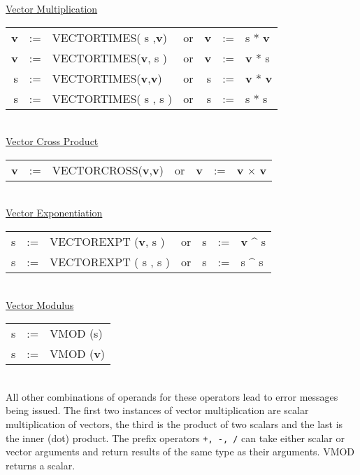 \underline{Vector Multiplication}\\
\begin{tabular}{rclcrcl}
{\bf v} &:=& VECTORTIMES(   s   ,{\bf v})  &{\rm or }& {\bf v} &:=&
s    *  {\bf v} \\
{\bf v} &:=& VECTORTIMES({\bf v},   s   )  &{\rm or }& {\bf v} &:=& {\bf
 v}  *     s    \\
   s    &:=& VECTORTIMES({\bf v},{\bf v})  &{\rm or }&    s    &:=& {\bf
 v}  *  {\bf v} \\
   s    &:=& VECTORTIMES(   s   ,   s   )  &{\rm or }&    s    &:=&
s    *     s    \\
\end{tabular} \\

\underline{Vector Cross Product} \\
\begin{tabular}{rclcrcl}
{\bf v} &:=& VECTORCROSS({\bf v},{\bf v})  &{\rm or }& {\bf v} &:=& {\bf
 v} $\times$   {\bf v} \\
\end{tabular} \\

\underline{Vector Exponentiation}\\
\begin{tabular}{rclcrcl}
   s    &:=& VECTOREXPT ({\bf v},   s   )  &{\rm or }&    s    &:=& {\bf
 v}  \^{} s   \\
   s    &:=& VECTOREXPT (   s   ,   s   )  &{\rm or }&    s    &:=&    s
     \^{} s   \\
\end{tabular} \\

\underline{Vector Modulus}\\
\begin{tabular}{rcl}
   s    &:=& VMOD (s)\\
   s    &:=& VMOD ({\bf v}) \\
\end{tabular} \\

All other combinations of operands for these operators lead to error
messages being issued.  The first two instances of vector
multiplication are scalar multiplication of vectors, the third is the
product of two scalars and the last is the inner (dot) product.  The
prefix operators  {\tt +, -, /} can take either scalar or vector
arguments and return results of the same type as their arguments.
VMOD returns a scalar.

